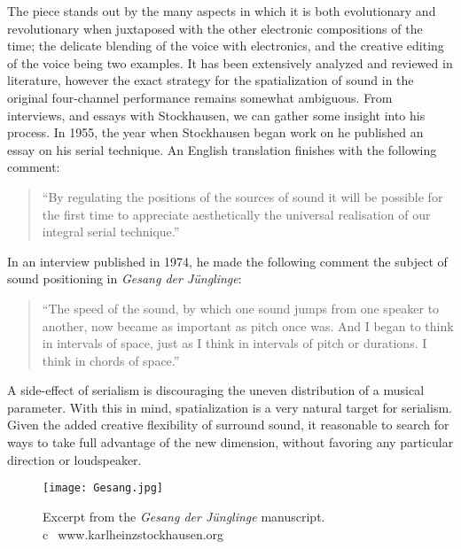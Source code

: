 The piece stands out by the many aspects in which it is both
evolutionary and revolutionary when juxtaposed with the other
electronic compositions of the time; the delicate blending of the
voice with electronics, and the creative editing of the voice being
two examples. It has been extensively analyzed and reviewed in
literature,\cite{Decroupet1998,Metzer2004,Miller2009} however the
exact strategy for the spatialization of sound in the original
four-channel performance remains somewhat ambiguous. From interviews,
and essays with Stockhausen, we can gather some insight into his
process. In 1955, the year when Stockhausen began work
on he published an essay on his serial technique. An English
translation finishes with the following comment:
\begin{quotation}
``By regulating the positions of the sources of sound it will be
possible for the first time to appreciate aesthetically the universal
realisation of our integral serial technique.''\cite{Stockhausen1955}
\end{quotation}
In an interview published in 1974, he made the following comment the
subject of sound positioning in \textit{Gesang der J\"{u}nglinge}:
\begin{quotation}
  ``The speed of the sound, by which one sound jumps from one speaker to
  another, now became as important as pitch once was. And I began to
  think in intervals of space, just as I think in intervals of pitch
  or durations. I think in chords of space.''\cite{Stockhausen1974}
\end{quotation}
A side-effect of serialism is discouraging the uneven distribution of
a musical parameter. With this in mind, spatialization is a very
natural target for serialism. Given the added creative flexibility of
surround sound, it reasonable to search for ways to take full
advantage of the new dimension, without favoring any particular
direction or loudspeaker.

\begin{figure}
  \texttt{[image: Gesang.jpg]}
  \caption{Excerpt from the \textit{Gesang der J\"{u}nglinge}
    manuscript. \textcircled{c}~www.karlheinzstockhausen.org}
  \label{fig:schaeffer-score}
\end{figure}

